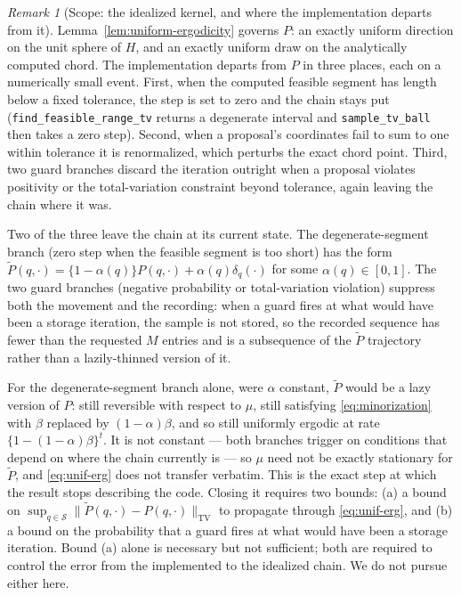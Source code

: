 \documentclass[11pt]{article}
\theoremstyle{plain}
\theoremstyle{definition}
\theoremstyle{remark}
\newtheorem{remark}[theorem]{Remark}
\newcommand{\cS}{\mathcal{S}}
\begin{document}
\begin{remark}[Scope: the idealized kernel, and where the implementation
departs from it]\label{rem:har-implementation}
Lemma~\ref{lem:uniform-ergodicity} governs $P$: an exactly uniform direction on the unit
sphere of $H$, and an exactly uniform draw on the analytically computed chord. The
implementation departs from $P$ in three places, each on a numerically small event.
First, when the computed feasible segment has length below a fixed tolerance, the step is
set to zero and the chain stays put (\texttt{find\_feasible\_range\_tv} returns a
degenerate interval and \texttt{sample\_tv\_ball} then takes a zero step). Second, when a
proposal's coordinates fail to sum to one within tolerance it is renormalized, which
perturbs the exact chord point. Third, two guard branches discard the iteration outright
when a proposal violates positivity or the total-variation constraint beyond tolerance,
again leaving the chain where it was.

Two of the three leave the chain at its current state. The degenerate-segment branch
(zero step when the feasible segment is too short) has the form
$\tilde P(q,\cdot)=\{1-\alpha(q)\}P(q,\cdot)+\alpha(q)\delta_q(\cdot)$ for some
$\alpha(q)\in[0,1]$. The two guard branches (negative probability or total-variation
violation) suppress both the movement and the recording: when a guard fires at what
would have been a storage iteration, the sample is not stored, so the recorded sequence
has fewer than the requested $M$ entries and is a subsequence of the $\tilde P$ trajectory
rather than a lazily-thinned version of it.

For the degenerate-segment branch alone, were $\alpha$ constant, $\tilde P$ would be a lazy
version of $P$: still reversible with respect to $\mu$, still satisfying \eqref{eq:minorization} with
$\beta$ replaced by $(1-\alpha)\beta$, and so still uniformly ergodic at rate
$\{1-(1-\alpha)\beta\}^t$. It is not constant --- both branches trigger on conditions
that depend on where the chain currently is --- so $\mu$ need not be exactly stationary
for $\tilde P$, and \eqref{eq:unif-erg} does not transfer verbatim. This is the exact
step at which the result stops describing the code. Closing it requires two bounds:
(a) a bound on $\sup_{q\in\cS}\|\tilde P(q,\cdot)-P(q,\cdot)\|_{\mathrm{TV}}$ to propagate
through \eqref{eq:unif-erg}, and (b) a bound on the probability that a guard fires at
what would have been a storage iteration. Bound (a) alone is necessary but not sufficient;
both are required to control the error from the implemented to the idealized chain. We do
not pursue either here.
\end{remark}
\end{document}
